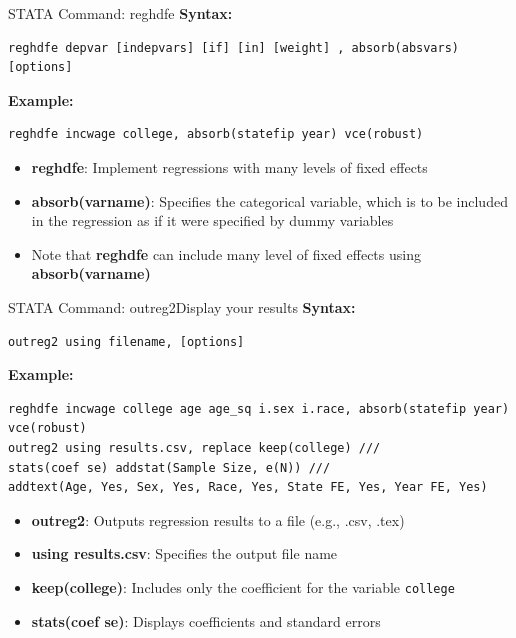 \documentclass[dvipsnames,hyperref={pdfpagelabels=false}]{beamer}
\begin{document}
\begin{frame}[fragile]{STATA Command: reghdfe}{}
	\noindent\textbf{Syntax:}
\begin{lstlisting}
reghdfe depvar [indepvars] [if] [in] [weight] , absorb(absvars) [options]
\end{lstlisting}
	
	\noindent\textbf{Example:}
\begin{lstlisting}
reghdfe incwage college, absorb(statefip year) vce(robust)
\end{lstlisting}	
	\begin{itemize}
		\item \textbf{reghdfe}: Implement regressions with many levels of fixed effects
		\vspace{0.2cm}
		\item \textbf{absorb(varname)}: Specifies the categorical variable, which is to be included in the regression as if it were specified by dummy variables
		\vspace{0.2cm}
		\item Note that \textbf{reghdfe} can include many level of fixed effects using \textbf{absorb(varname)}
	
		
	\end{itemize}
	
	
\end{frame}



\begin{frame}[fragile]{STATA Command: outreg2}{Display your results}
	\noindent\textbf{Syntax:}
\begin{lstlisting}
outreg2 using filename, [options]
\end{lstlisting}
	
	\noindent\textbf{Example:}
\begin{lstlisting}
reghdfe incwage college age age_sq i.sex i.race, absorb(statefip year) vce(robust)
outreg2 using results.csv, replace keep(college) ///
stats(coef se) addstat(Sample Size, e(N)) ///
addtext(Age, Yes, Sex, Yes, Race, Yes, State FE, Yes, Year FE, Yes)
\end{lstlisting}
	
	\begin{itemize}
		\item \textbf{outreg2}: Outputs regression results to a file (e.g., .csv, .tex)
		\vspace{0.2cm}
		\item \textbf{using results.csv}: Specifies the output file name
		\vspace{0.2cm}
		\item \textbf{keep(college)}: Includes only the coefficient for the variable \texttt{college}
		\vspace{0.2cm}
		\item \textbf{stats(coef se)}: Displays coefficients and standard errors
		
	\end{itemize}
\end{frame}
\end{document}
